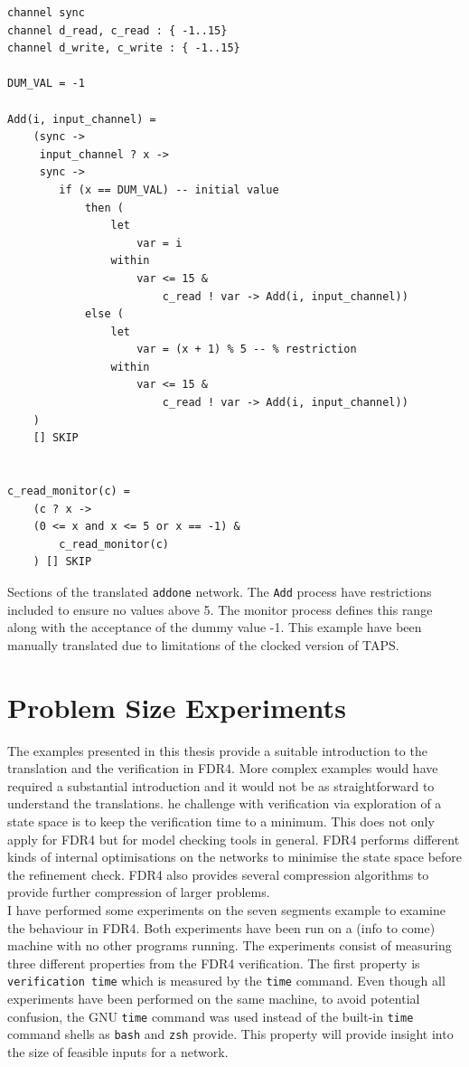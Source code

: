 \begin{listing}
\begin{verbatim}
channel sync
channel d_read, c_read : { -1..15}
channel d_write, c_write : { -1..15}

DUM_VAL = -1

Add(i, input_channel) =
    (sync ->
     input_channel ? x ->
     sync ->
        if (x == DUM_VAL) -- initial value
            then (
                let
                    var = i
                within
                    var <= 15 &
                        c_read ! var -> Add(i, input_channel))
            else (
                let
                    var = (x + 1) % 5 -- % restriction
                within
                    var <= 15 &
                        c_read ! var -> Add(i, input_channel))
    )
    [] SKIP


c_read_monitor(c) =
    (c ? x ->
    (0 <= x and x <= 5 or x == -1) &
        c_read_monitor(c)
    ) [] SKIP

\end{verbatim}
\caption{Sections of the translated \texttt{addone} network. The \texttt{Add} process have restrictions included to ensure no values above 5. The monitor process defines this range along with the acceptance of the dummy value -1. This example have been manually translated due to limitations of the clocked version of TAPS.}
\label{lst:cspm_addone_restricted}
\end{listing}
\section{Problem Size Experiments}
The examples presented in this thesis provide a suitable introduction to the translation and the verification in FDR4. More complex examples would have required a substantial introduction and it would not be as straightforward to understand the translations. he challenge with verification via exploration of a state space is to keep the verification time to a minimum. This does not only apply for FDR4 but for model checking tools in general. FDR4 performs different kinds of internal optimisations on the networks to minimise the state space before the refinement check. FDR4 also provides several compression algorithms to provide further compression of larger problems. \\

I have performed some experiments on the seven segments example to examine the behaviour in FDR4.
Both experiments have been run on a (info to come) %
machine with no other programs running. The experiments consist of measuring three different properties from the FDR4 verification. The first property is \texttt{verification time} which is measured by the \texttt{time} command. Even though all experiments have been performed on the same machine, to avoid potential confusion, the GNU \texttt{time} command was used instead of the built-in \texttt{time} command shells as \texttt{bash} and \texttt{zsh} provide. This property will provide insight into the size of feasible inputs for a \cspm{} network.\\

